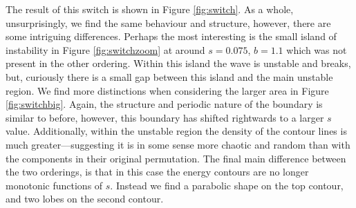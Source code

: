 The result of this switch is shown in Figure \ref{fig:switch}. As a whole, unsurprisingly, we find the same behaviour and structure, however, there are some intriguing differences. Perhaps the most interesting is the small island of instability in Figure \ref{fig:switchzoom} at around $s = 0.075$, $b = 1.1$ which was not present in the other ordering. Within this island the wave is unstable and breaks, but, curiously there is a small gap between this island and the main unstable region. We find more distinctions when considering the larger area in Figure \ref{fig:switchbig}. Again, the structure and periodic nature of the boundary is similar to before, however, this boundary has shifted rightwards to a larger $s$ value. Additionally, within the unstable region the density of the contour lines is much greater---suggesting it is in some sense more chaotic and random than with the components in their original permutation. The final main difference between the two orderings, is that in this case the energy contours are no longer monotonic functions of $s$. Instead we find a parabolic shape on the top contour, and two lobes on the second contour.





